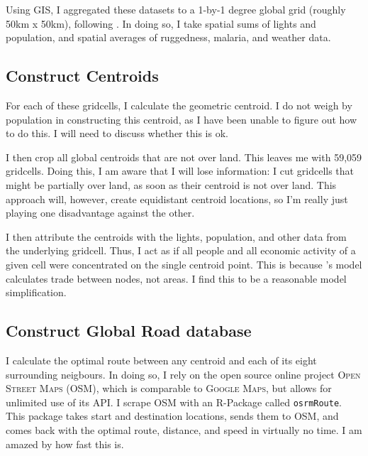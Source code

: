 \documentclass[11pt, oneside]{article}   	%
\begin{document}
Using GIS, I aggregated these datasets to a 1-by-1 degree global grid (roughly 50km x 50km), following \cite{fajgelbaum_optimal_2017}. In doing so, I take spatial sums of lights and population, and spatial averages of ruggedness, malaria, and weather data.

\subsection{Construct Centroids}
For each of these gridcells, I calculate the geometric centroid. I do not weigh by population in constructing this centroid, as I have been unable to figure out how to do this. I will need to discuss whether this is ok.

I then crop all global centroids that are not over land. This leaves me with 59,059 gridcells. Doing this, I am aware that I will lose information: I cut gridcells that might be partially over land, as soon as their centroid is not over land. This approach will, however, create equidistant centroid locations, so I'm really just playing one disadvantage against the other.

I then attribute the centroids with the lights, population, and other data from the underlying gridcell. Thus, I act as if all people and all economic activity of a given cell were concentrated on the single centroid point. This is because \citeauthor{fajgelbaum_optimal_2017}'s model calculates trade between nodes, not areas. I find this to be a reasonable model simplification.

\subsection{Construct Global Road database}
I calculate the optimal route between any centroid and each of its eight surrounding neigbours. In doing so, I rely on the open source online project \textsc{Open Street Maps} (OSM), which is comparable to \textsc{Google Maps}, but allows for unlimited use of its API. I scrape OSM with an R-Package called \texttt{osrmRoute}. This package takes start and destination locations, sends them to OSM, and comes back with the optimal route, distance, and speed in virtually no time. I am amazed by how fast this is.
\end{document}
